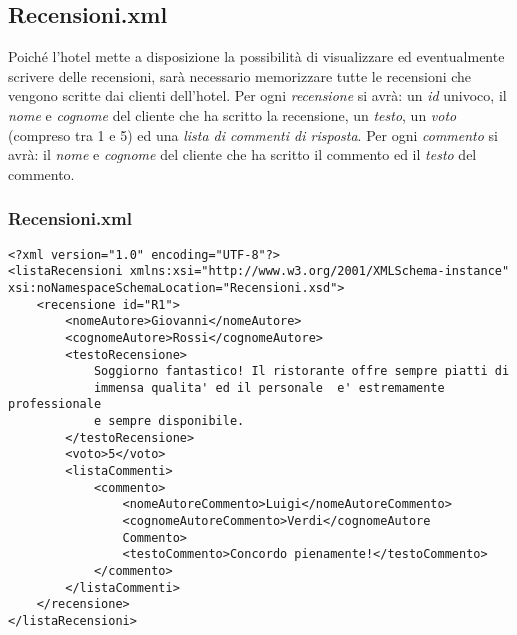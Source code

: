 \documentclass [a4paper, 12pt]{book}
\begin{document}
\subsection{Recensioni.xml}
Poiché l'hotel mette a disposizione la possibilità di visualizzare ed eventualmente scrivere delle recensioni, sarà necessario memorizzare tutte le recensioni che vengono scritte dai clienti dell'hotel. Per ogni \textit{recensione} si avrà: un \textit{id} univoco, il \textit{nome} e \textit{cognome} del cliente che ha scritto la recensione, un \textit{testo}, un \textit{voto} (compreso tra 1 e 5) ed una \textit{lista di commenti di risposta}. Per ogni \textit{commento} si avrà: il \textit{nome} e \textit{cognome} del cliente che ha scritto il commento ed il \textit{testo} del commento.

\subsubsection{Recensioni.xml}
\begin{lstlisting}[style=XML]
<?xml version="1.0" encoding="UTF-8"?>
<listaRecensioni xmlns:xsi="http://www.w3.org/2001/XMLSchema-instance" xsi:noNamespaceSchemaLocation="Recensioni.xsd">
    <recensione id="R1">
        <nomeAutore>Giovanni</nomeAutore>
        <cognomeAutore>Rossi</cognomeAutore>
        <testoRecensione>
            Soggiorno fantastico! Il ristorante offre sempre piatti di
            immensa qualita' ed il personale  e' estremamente professionale
            e sempre disponibile. 
        </testoRecensione>
        <voto>5</voto>
        <listaCommenti>
            <commento>
                <nomeAutoreCommento>Luigi</nomeAutoreCommento>
                <cognomeAutoreCommento>Verdi</cognomeAutore
                Commento>
                <testoCommento>Concordo pienamente!</testoCommento>
            </commento>
        </listaCommenti>
    </recensione>
</listaRecensioni>
\end{lstlisting}
\end{document}
